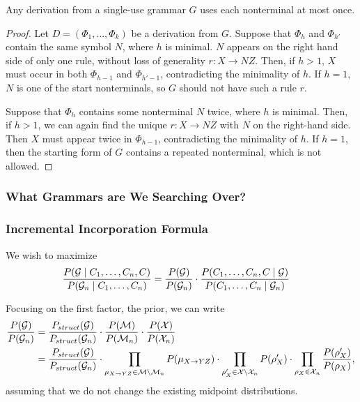 \documentclass{article}
\begin{document}
\begin{lem}
Any derivation from a single-use grammar $G$ uses each nonterminal at
most once. 
\end{lem}
\begin{proof}
Let $D = (\Phi_1, \dots, \Phi_k)$ be a derivation from $G$.  Suppose
that $\Phi_h$ and $\Phi_{h'}$ contain the same symbol $N$, where $h$
is minimal. $N$ appears on the right hand side of only one rule,
without loss of generality $r : X \to N Z$. Then, if $h>1$, $X$ must
occur in both $\Phi_{h-1}$ and $\Phi_{h'-1}$, contradicting the
minimality of $h$. If $h=1$, $N$ is one of the start nonterminals, so
$G$ should not have such a rule $r$.

Suppose that $\Phi_h$ contains some nonterminal $N$ twice, where $h$
is minimal. Then, if $h>1$, we can again find the unique $r : X \to N
Z$ with $N$ on the right-hand side. Then $X$ must appear twice in
$\Phi_{h-1}$, contradicting the minimality of $h$. If $h=1$, then the
starting form of $G$ contains a repeated nonterminal, which is not
allowed.
\end{proof}

\subsubsection{What Grammars are We Searching Over?}

\subsubsection{Incremental Incorporation Formula}

We wish to maximize 
\begin{align*}
\frac{P({\mathcal G} \mid C_1, \dots, C_n, C)}{P({\mathcal G}_n\mid C_1, \dots, C_n)}
&= \frac{P({\mathcal G})}{P({\mathcal G}_n)} \cdot 
\frac{P(C_1,\dots,C_n, C\mid {\mathcal G})}{P(C_1,\dots,C_n \mid {\mathcal G}_n)}
\end{align*}

Focusing on the first factor, the prior, we can write
\begin{align*}
\frac{P({\mathcal G})}{P({\mathcal G}_n)} &=
\frac{P_{struct}({\mathcal G})}{P_{struct}({\mathcal G}_n)}
\cdot
\frac{P({\mathcal M})}{P({\mathcal M}_n)}
\cdot
\frac{P({\mathcal X})}{P({\mathcal X}_n)} \\
&= 
\frac{P_{struct}({\mathcal G})}{P_{struct}({\mathcal G}_n)}
\cdot
\prod_{\mu_{X\to YZ}\in {\mathcal M}\setminus {\mathcal M}_n} P(\mu_{X\to YZ})
\cdot
\prod_{\rho'_X \in {\mathcal X} \setminus {\mathcal X}_n} P(\rho'_X)
\cdot 
\prod_{\rho_X \in {\mathcal X}_n} \frac{P(\rho'_X)}{P(\rho_X)},\\
\end{align*}
assuming that we do not change the existing midpoint distributions.
\end{document}

